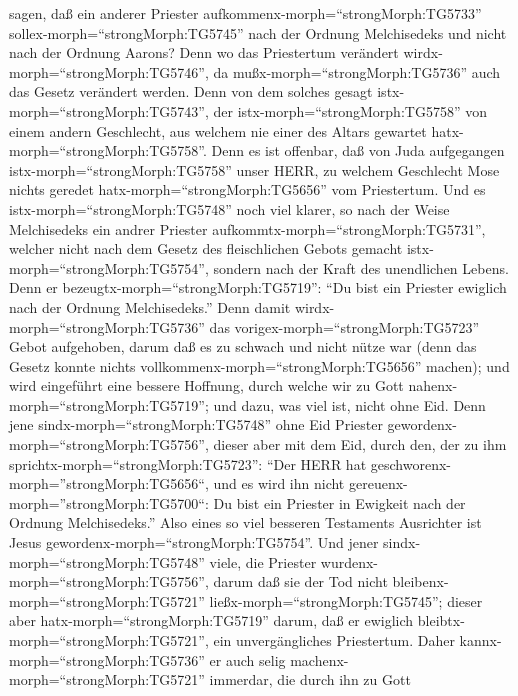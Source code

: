 sagen, daß ein anderer Priester aufkommenx-morph=``strongMorph:TG5733''
sollex-morph=``strongMorph:TG5745'' nach der Ordnung Melchisedeks und
nicht nach der Ordnung Aarons?  Denn wo das Priestertum
verändert wirdx-morph=``strongMorph:TG5746'', da
mußx-morph=``strongMorph:TG5736'' auch das Gesetz verändert werden.
 Denn von dem solches gesagt
istx-morph=``strongMorph:TG5743'', der istx-morph=``strongMorph:TG5758''
von einem andern Geschlecht, aus welchem nie einer des Altars gewartet
hatx-morph=``strongMorph:TG5758''.  Denn es ist offenbar,
daß von Juda aufgegangen istx-morph=``strongMorph:TG5758'' unser HERR,
zu welchem Geschlecht Mose nichts geredet
hatx-morph=``strongMorph:TG5656'' vom Priestertum.  Und es
istx-morph=``strongMorph:TG5748'' noch viel klarer, so nach der Weise
Melchisedeks ein andrer Priester aufkommtx-morph=``strongMorph:TG5731'',
 welcher nicht nach dem Gesetz des fleischlichen Gebots
gemacht istx-morph=``strongMorph:TG5754'', sondern nach der Kraft des
unendlichen Lebens.  Denn er
bezeugtx-morph=``strongMorph:TG5719'': ``Du bist ein Priester ewiglich
nach der Ordnung Melchisedeks.''  Denn damit
wirdx-morph=``strongMorph:TG5736'' das
vorigex-morph=``strongMorph:TG5723'' Gebot aufgehoben, darum daß es zu
schwach und nicht nütze war  (denn das Gesetz konnte nichts
vollkommenx-morph=``strongMorph:TG5656'' machen); und wird eingeführt
eine bessere Hoffnung, durch welche wir zu Gott
nahenx-morph=``strongMorph:TG5719'';  und dazu, was viel
ist, nicht ohne Eid. Denn jene sindx-morph=``strongMorph:TG5748'' ohne
Eid Priester gewordenx-morph=``strongMorph:TG5756'', 
dieser aber mit dem Eid, durch den, der zu ihm
sprichtx-morph=``strongMorph:TG5723'': ``Der HERR hat
geschworenx-morph=''strongMorph:TG5656``, und es wird ihn nicht
gereuenx-morph=''strongMorph:TG5700``: Du bist ein Priester in Ewigkeit
nach der Ordnung Melchisedeks.''  Also eines so viel
besseren Testaments Ausrichter ist Jesus
gewordenx-morph=``strongMorph:TG5754''.  Und jener
sindx-morph=``strongMorph:TG5748'' viele, die Priester
wurdenx-morph=``strongMorph:TG5756'', darum daß sie der Tod nicht
bleibenx-morph=``strongMorph:TG5721''
ließx-morph=``strongMorph:TG5745'';  dieser aber
hatx-morph=``strongMorph:TG5719'' darum, daß er ewiglich
bleibtx-morph=``strongMorph:TG5721'', ein unvergängliches Priestertum.
 Daher kannx-morph=``strongMorph:TG5736'' er auch selig
machenx-morph=``strongMorph:TG5721'' immerdar, die durch ihn zu Gott
